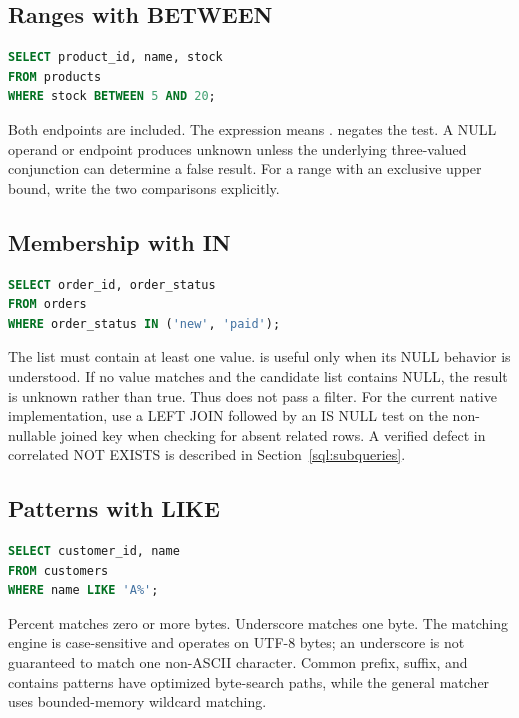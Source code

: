 \subsection{Ranges with BETWEEN}

\begin{lstlisting}[language=SQL]
SELECT product_id, name, stock
FROM products
WHERE stock BETWEEN 5 AND 20;
\end{lstlisting}

Both endpoints are included. The expression means .  negates the test. A NULL operand or endpoint produces unknown unless the underlying three-valued conjunction can determine a false result. For a range with an exclusive upper bound, write the two comparisons explicitly.

\subsection{Membership with IN}

\begin{lstlisting}[language=SQL]
SELECT order_id, order_status
FROM orders
WHERE order_status IN ('new', 'paid');
\end{lstlisting}

The list must contain at least one value.  is useful only when its NULL behavior is understood. If no value matches and the candidate list contains NULL, the result is unknown rather than true. Thus  does not pass a filter. For the current native implementation, use a LEFT JOIN followed by an IS NULL test on the non-nullable joined key when checking for absent related rows. A verified defect in correlated NOT EXISTS is described in Section~\ref{sql:subqueries}.

\subsection{Patterns with LIKE}

\begin{lstlisting}[language=SQL]
SELECT customer_id, name
FROM customers
WHERE name LIKE 'A%';
\end{lstlisting}

Percent matches zero or more bytes. Underscore matches one byte. The matching engine is case-sensitive and operates on UTF-8 bytes; an underscore is not guaranteed to match one non-ASCII character. Common prefix, suffix, and contains patterns have optimized byte-search paths, while the general matcher uses bounded-memory wildcard matching.

